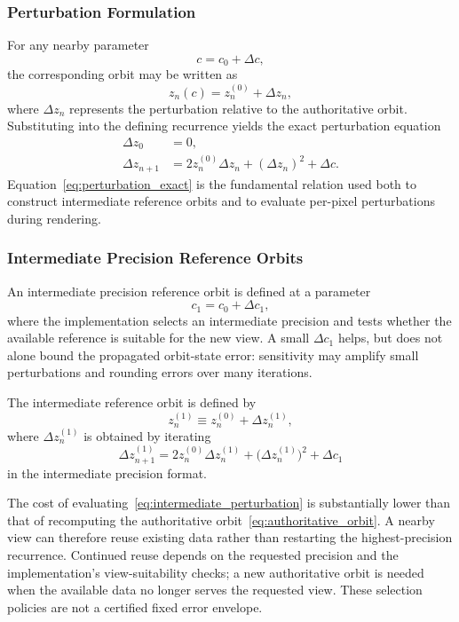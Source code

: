 \subsubsection{Perturbation Formulation}

For any nearby parameter
\[
c = c_0 + \Delta c,
\]
the corresponding orbit may be written as
\[
z_n(c) = z^{(0)}_n + \Delta z_n,
\]
where $\Delta z_n$ represents the perturbation relative to the authoritative orbit.
Substituting into the defining recurrence yields the exact perturbation equation
\begin{align}
\Delta z_0 &= 0, \label{eq:perturbation-init} \\
\Delta z_{n+1}
&= 2 z^{(0)}_n \Delta z_n + (\Delta z_n)^2 + \Delta c.
\label{eq:perturbation_exact}
\end{align}
Equation~\eqref{eq:perturbation_exact} is the fundamental relation used both to construct intermediate reference orbits
and to evaluate per-pixel perturbations during rendering.

\subsubsection{Intermediate Precision Reference Orbits}

An intermediate precision reference orbit is defined at a parameter
\[
c_1 = c_0 + \Delta c_1,
\]
where the implementation selects an intermediate precision and tests whether
the available reference is suitable for the new view.  A small $\Delta c_1$
helps, but does not alone bound the propagated orbit-state error: sensitivity may
amplify small perturbations and rounding errors over many iterations.

The intermediate reference orbit is defined by
\[
z^{(1)}_n \equiv z^{(0)}_n + \Delta z^{(1)}_n,
\]
where $\Delta z^{(1)}_n$ is obtained by iterating
\begin{equation}
\Delta z^{(1)}_{n+1}
= 2 z^{(0)}_n \Delta z^{(1)}_n
  + \bigl(\Delta z^{(1)}_n\bigr)^2
  + \Delta c_1
\label{eq:intermediate_perturbation}
\end{equation}
in the intermediate precision format.

The cost of evaluating~\eqref{eq:intermediate_perturbation} is substantially lower than that of recomputing
the authoritative orbit~\eqref{eq:authoritative_orbit}.
A nearby view can therefore reuse existing data rather than restarting the
highest-precision recurrence.  Continued reuse depends on the requested
precision and the implementation's view-suitability checks; a new authoritative
orbit is needed when the available data no longer serves the requested view.
These selection policies are not a certified fixed error envelope.

